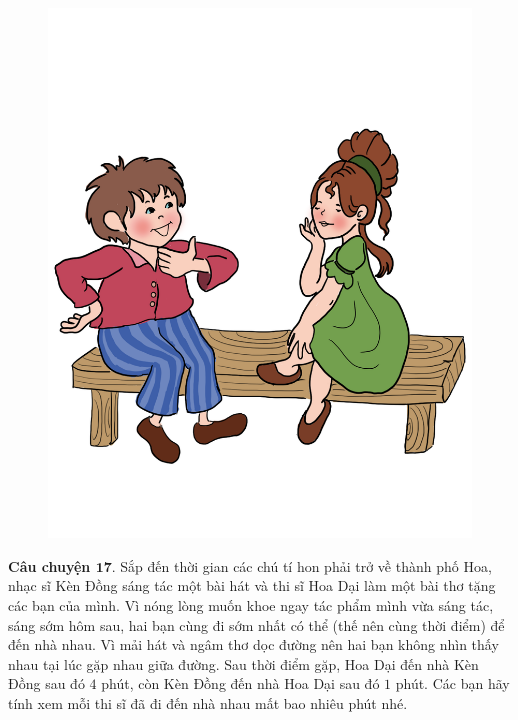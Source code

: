 		\begin{figure}
		\centering
		\vspace*{-5pt}
		\captionsetup{labelformat= empty, justification=centering}
		\includegraphics[width=1\linewidth]{Hinh19_KenDong_HoaGiay}
		\vspace*{-15pt}
	\end{figure}
	\textbf{\color{toancuabi}Câu chuyện $\pmb{17.}$} Sắp đến thời gian các chú tí hon phải trở về thành phố Hoa, nhạc sĩ Kèn Đồng sáng tác một bài hát và thi sĩ Hoa Dại làm một bài thơ tặng các bạn của mình. Vì nóng lòng muốn khoe ngay tác phẩm mình vừa sáng tác, sáng sớm hôm sau, hai bạn cùng đi sớm nhất có thể (thế nên cùng thời điểm) để đến nhà nhau. Vì mải hát và ngâm thơ dọc đường nên hai bạn không nhìn thấy nhau tại lúc gặp nhau giữa đường. Sau thời điểm gặp, Hoa Dại đến nhà Kèn Đồng sau đó $4$ phút, còn Kèn Đồng đến nhà Hoa Dại sau đó $1$ phút. Các bạn hãy tính xem mỗi thi sĩ đã đi đến nhà nhau mất bao nhiêu phút nhé.
	\newpage
